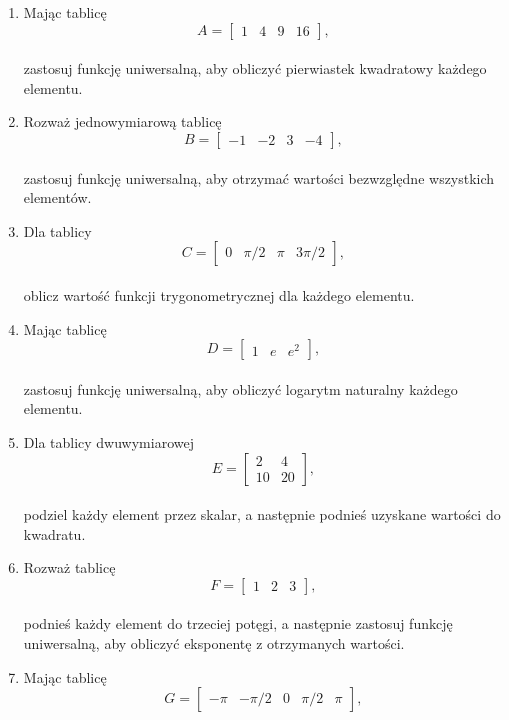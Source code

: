 \documentclass[
  letterpaper,
  DIV=11,
  numbers=noendperiod]{scrreprt}
\begin{document}
\begin{enumerate}
\def\labelenumi{\arabic{enumi}.}
\item
  Mając tablicę\\
  \[A = \begin{bmatrix}1 & 4 & 9 & 16\end{bmatrix},\]\\
  zastosuj funkcję uniwersalną, aby obliczyć pierwiastek kwadratowy
  każdego elementu.
\item
  Rozważ jednowymiarową tablicę\\
  \[B = \begin{bmatrix}-1 & -2 & 3 & -4\end{bmatrix},\]\\
  zastosuj funkcję uniwersalną, aby otrzymać wartości bezwzględne
  wszystkich elementów.
\item
  Dla tablicy\\
  \[C = \begin{bmatrix}0 & \pi/2 & \pi & 3\pi/2\end{bmatrix},\]\\
  oblicz wartość funkcji trygonometrycznej dla każdego elementu.
\item
  Mając tablicę\\
  \[D = \begin{bmatrix}1 & e & e^2 \end{bmatrix},\]\\
  zastosuj funkcję uniwersalną, aby obliczyć logarytm naturalny każdego
  elementu.
\item
  Dla tablicy dwuwymiarowej\\
  \[E = \begin{bmatrix}2 & 4 \\ 10 & 20 \end{bmatrix},\]\\
  podziel każdy element przez skalar, a następnie podnieś uzyskane
  wartości do kwadratu.
\item
  Rozważ tablicę\\
  \[F = \begin{bmatrix}1 & 2 & 3\end{bmatrix},\]\\
  podnieś każdy element do trzeciej potęgi, a następnie zastosuj funkcję
  uniwersalną, aby obliczyć eksponentę z otrzymanych wartości.
\item
  Mając tablicę\\
  \[G = \begin{bmatrix}-\pi & -\pi/2 & 0 & \pi/2 & \pi\end{bmatrix},\]\\

\end{enumerate}
\end{document}
